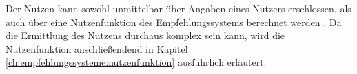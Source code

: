 
Der Nutzen kann sowohl unmittelbar über Angaben eines Nutzers erschlossen, als auch über eine Nutzenfunktion des Empfehlungssystems berechnet werden \cite[S. 735]{adomavicius:inproceedings}.
Da die Ermittlung des Nutzens durchaus komplex sein kann, wird die Nutzenfunktion anschließendend in Kapitel \ref{ch:empfehlungssysteme:nutzenfunktion} ausführlich erläutert.

